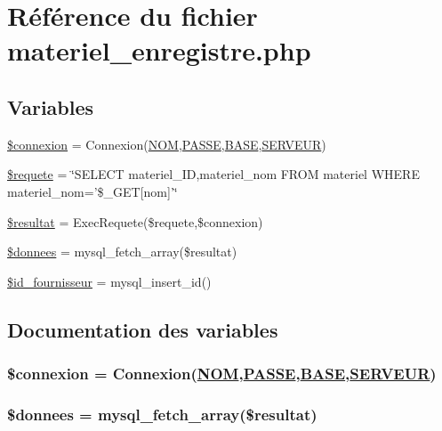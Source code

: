 \hypertarget{materiel__enregistre_8php}{
\section{R\'{e}f\'{e}rence du fichier materiel\_\-enregistre.php}
\label{materiel__enregistre_8php}
}
\subsection*{Variables}
\begin{CompactItemize}
\item 
\hyperlink{materiel__enregistre_8php_a0}{\$connexion} = Connexion(\hyperlink{pma__connect_8php_a0}{NOM},\hyperlink{pma__connect_8php_a1}{PASSE},\hyperlink{pma__connect_8php_a3}{BASE},\hyperlink{pma__connect_8php_a2}{SERVEUR})
\item 
\hyperlink{materiel__enregistre_8php_a1}{\$requete} = \char`\"{}SELECT materiel\_\-ID,materiel\_\-nom FROM materiel WHERE materiel\_\-nom='\$\_\-GET\mbox{[}nom\mbox{]}'\char`\"{}
\item 
\hyperlink{materiel__enregistre_8php_a2}{\$resultat} = Exec\-Requete(\$requete,\$connexion)
\item 
\hyperlink{materiel__enregistre_8php_a3}{\$donnees} = mysql\_\-fetch\_\-array(\$resultat)
\item 
\hyperlink{materiel__enregistre_8php_a4}{\$id\_\-fournisseur} = mysql\_\-insert\_\-id()
\end{CompactItemize}


\subsection{Documentation des variables}
\hypertarget{materiel__enregistre_8php_a0}{
\subsubsection[\$connexion]{\setlength{\rightskip}{0pt plus 5cm}\$connexion = Connexion(\hyperlink{pma__connect_8php_a0}{NOM},\hyperlink{pma__connect_8php_a1}{PASSE},\hyperlink{pma__connect_8php_a3}{BASE},\hyperlink{pma__connect_8php_a2}{SERVEUR})}}
\label{materiel__enregistre_8php_a0}


\hypertarget{materiel__enregistre_8php_a3}{
\subsubsection[\$donnees]{\setlength{\rightskip}{0pt plus 5cm}\$donnees = mysql\_\-fetch\_\-array(\$resultat)}}
\label{materiel__enregistre_8php_a3}


